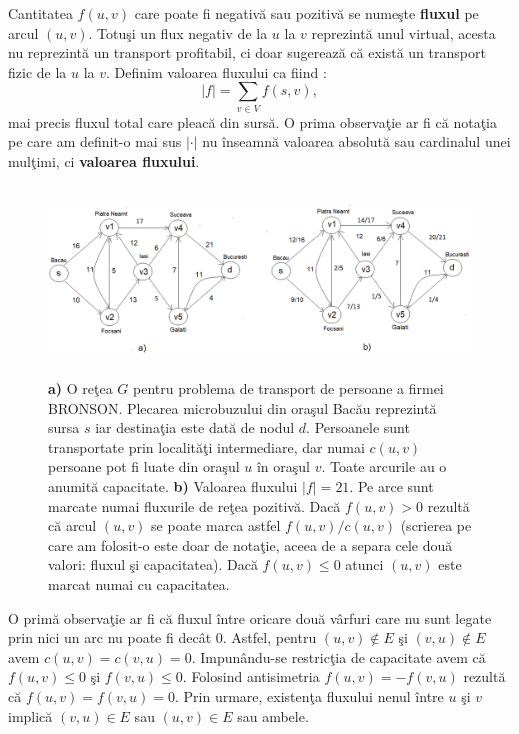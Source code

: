 \documentclass[11pt,a4paper]{report}
\begin{document}
 	
 	Cantitatea $f(u,v)$ care poate fi negativ\u a sau pozitiv\u a se nume\c ste \textbf{fluxul} pe arcul $(u,v)$. Totu\c si un flux negativ de la $u$ la $v$ reprezint\u a unul virtual, acesta nu reprezint\u a un transport profitabil, ci doar sugereaz\u a c\u a exist\u a un transport fizic de la $u$ la $v$. Definim valoarea fluxului ca fiind :
 	 		\begin{equation*}
 	|f|=\sum\limits_{v\in V} f(s,v),
 	\end{equation*}
 	mai precis fluxul total care pleac\u a din surs\u a. O prima observa\c tie ar fi c\u a nota\c tia pe care am definit-o mai sus  $|\cdot|$ nu \^ inseamn\u a valoarea absolut\u a sau cardinalul unei mul\c timi, ci  \textbf{valoarea fluxului}.
 	
 \begin{figure}[!hbt]
 	\centering
 	\includegraphics[width=12cm,height=5cm]{Flux.png}
 	\caption{\textbf{a)} O re\c tea $G$ pentru problema de transport de persoane a firmei BRONSON. Plecarea microbuzului din ora\c sul Bac\u au reprezint\u a sursa $s$ iar destina\c tia este dat\u a de nodul $d$. Persoanele sunt transportate prin localit\u a\c ti intermediare, dar numai $c(u,v)$ persoane pot fi luate din ora\c sul $u$ \^ in ora\c sul $v$. Toate arcurile au o anumit\u a capacitate. \textbf{b)} Valoarea fluxului $|f|=21$. Pe arce sunt marcate numai fluxurile de re\c tea pozitiv\u a. Dac\u a $f(u,v)>0$ rezult\u a c\u a arcul $(u,v)$ se poate marca astfel $f(u,v)/c(u,v)$ (scrierea pe care am folosit-o este doar de nota\c tie, aceea de a separa cele dou\u a valori: fluxul \c si capacitatea). Dac\u a $f(u,v)\leq 0$ atunci $(u,v)$ este marcat numai cu capacitatea. }
 \end{figure}

O prim\u a observa\c tie ar fi c\u a fluxul \^ intre oricare dou\u a v\^ arfuri care nu sunt legate prin nici un arc nu poate fi dec\^at 0. Astfel, pentru $(u,v)\notin E$ \c si $(v,u)\notin E$ avem $c(u,v)=c(v,u)=0$. Impun\^ andu-se restric\c tia de capacitate avem c\u a $f(u,v)\leq 0$ \c si $f(v,u)\leq 0$. Folosind antisimetria  $f(u,v)=-f(v,u)$ rezult\u a c\u a $f(u,v)=f(v,u)=0$. Prin urmare, existen\c ta fluxului nenul \^ intre $u$ \c si $v$ implic\u a $(v,u)\in E$ sau $(u,v)\in E$ sau ambele. 
\end{document}
